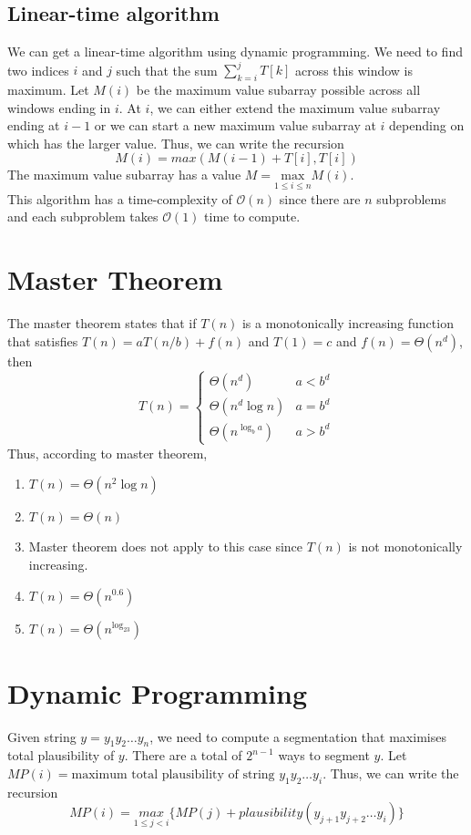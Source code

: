 \documentclass[10pt,a4paper]{article}
\begin{document}
\subsection{Linear-time algorithm}
We can get a linear-time algorithm using dynamic programming. We need to find two indices $i$ and $j$ such that the sum $\sum_{k=i}^{j} T[k]$ across this window is maximum. Let $M(i)$ be the maximum value subarray possible across all windows ending in $i$. At $i$, we can either extend the maximum value subarray ending at $i-1$ or we can start a new maximum value subarray at $i$ depending on which has the larger value. Thus, we can write the recursion
$$M(i) = max(M(i-1) + T[i], T[i])$$
The maximum value subarray has a value $M = \underset{1\leq i \leq n}{\text{max}} M(i)$. \\
This algorithm has a time-complexity of $\mathcal{O}(n)$ since there are $n$ subproblems and each subproblem takes $\mathcal{O}(1)$ time to compute.

\section{Master Theorem}
The master theorem states that if $T(n)$ is a monotonically increasing function that satisfies $T(n) = aT(n/b) + f(n)$ and $T(1) = c$ and $f(n) = \Theta(n^d)$, then
$$T(n) = \begin{cases} 
      \Theta(n^d) & a < b^d \\
      \Theta(n^d\log n) & a = b^d \\
      \Theta(n^{\log_ba}) & a > b^d 
   \end{cases}
$$
Thus, according to master theorem,
\begin{enumerate}
\item $T(n) = \Theta(n^2\log n)$
\item $T(n) = \Theta(n)$
\item Master theorem does not apply to this case since $T(n)$ is not monotonically increasing.
\item $T(n) = \Theta(n^{0.6})$
\item $T(n) = \Theta(n^{\log_23})$ 
\end{enumerate}

\section{Dynamic Programming}
Given string $y = y_1y_2\ldots y_n$, we need to compute a segmentation that maximises total plausibility of $y$. There are a total of $2^{n-1}$ ways to segment $y$. Let $MP(i) = \text{maximum total plausibility of string }y_1y_2\ldots y_i$. Thus, we can write the recursion
$$MP(i) = \underset{1 \leq j < i}{max} \big\{ MP(j) + plausibility(y_{j+1}y_{j+2}\ldots y_i) \big\}$$ 
\end{document}
